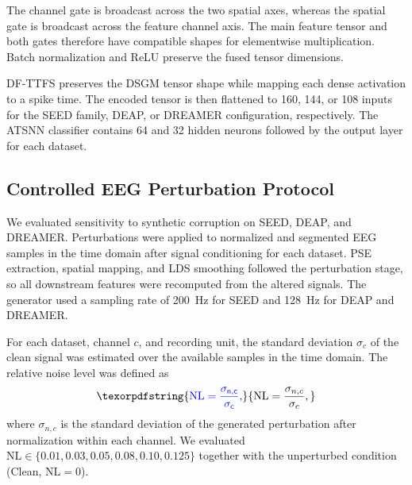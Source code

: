 \documentclass[12pt]{article}
\providecommand{\DIFaddtex}[1]{{\protect\color{blue}\sf #1}}
\providecommand{\DIFadd}[1]{\texorpdfstring{\DIFaddtex{#1}}{#1}}
\providecommand{\DIFaddFL}[1]{\DIFadd{#1}}
\begin{document}
\DIFadd{The channel gate is broadcast across the two spatial axes, whereas the spatial gate is broadcast across the feature channel axis. The main feature tensor and both gates therefore have compatible shapes for elementwise multiplication. Batch normalization and ReLU preserve the fused tensor dimensions.
}

\begin{table}[htbp]
\centering
\caption{\DIFaddFL{Implementation dimensions by dataset.}}
\label{tab:dataset_implementation_dimensions}
{\footnotesize
\setlength{\tabcolsep}{6pt}
\renewcommand{\arraystretch}{1.15}
}
\end{table}

\DIFadd{DF-TTFS preserves the DSGM tensor shape while mapping each dense activation to a spike time. The encoded tensor is then flattened to 160, 144, or 108 inputs for the SEED family, DEAP, or DREAMER configuration, respectively. The ATSNN classifier contains 64 and 32 hidden neurons followed by the output layer for each dataset.
}

\subsection{\DIFadd{Controlled EEG Perturbation Protocol}}\label{supp:controlled_perturbations}

\DIFadd{We evaluated sensitivity to synthetic corruption on SEED, DEAP, and DREAMER. Perturbations were applied to normalized and segmented EEG samples in the time domain after signal conditioning for each dataset. PSE extraction, spatial mapping, and LDS smoothing followed the perturbation stage, so all downstream features were recomputed from the altered signals. The generator used a sampling rate of 200~Hz for SEED and 128~Hz for DEAP and DREAMER.
}

\DIFadd{For each dataset, channel $c$, and recording unit, the standard deviation $\sigma_c$ of the clean signal was estimated over the available samples in the time domain. The relative noise level was defined as
}\begin{equation}
\DIFadd{\mathrm{NL}=\frac{\sigma_{n,c}}{\sigma_c},
\label{eq:relative_noise_level}
}\end{equation}
\DIFadd{where $\sigma_{n,c}$ is the standard deviation of the generated perturbation after normalization within each channel. We evaluated $\mathrm{NL}\in\{0.01,0.03,0.05,0.08,0.10,0.125\}$ together with the unperturbed condition (Clean, $\mathrm{NL}=0$).
}
\end{document}
